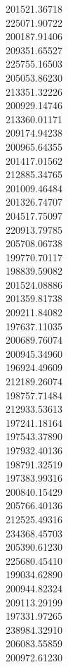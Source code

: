201521.36718\\
225071.90722\\
200187.91406\\
209351.65527\\
225755.16503\\
205053.86230\\
213351.32226\\
200929.14746\\
213360.01171\\
209174.94238\\
200965.64355\\
201417.01562\\
212885.34765\\
201009.46484\\
201326.74707\\
204517.75097\\
220913.79785\\
205708.06738\\
199770.70117\\
198839.59082\\
201524.08886\\
201359.81738\\
209211.84082\\
197637.11035\\
200689.76074\\
200945.34960\\
196924.49609\\
212189.26074\\
198757.71484\\
212933.53613\\
197241.18164\\
197543.37890\\
197932.40136\\
198791.32519\\
197383.99316\\
200840.15429\\
205766.40136\\
212525.49316\\
234368.45703\\
205390.61230\\
225680.45410\\
199034.62890\\
200944.82324\\
209113.29199\\
197331.97265\\
238984.32910\\
206083.55859\\
200972.61230\\

